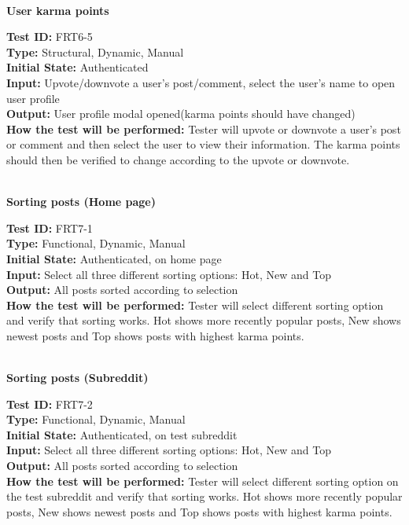 \documentclass[12pt,fleqn]{article}
\begin{document}
\textbf{\\User karma points}
\begin{tcolorbox}
\textbf{Test ID:} FRT6-5\\
\textbf{Type:} Structural, Dynamic, Manual\\
\textbf{Initial State:} Authenticated\\
\textbf{Input:} Upvote/downvote a user's post/comment, select the user's name to open user profile  \\
\textbf{Output:} User profile modal opened(karma points should have changed)\\
\textbf{How the test will be performed:} Tester will upvote or downvote a user's post or comment and then select the user to view their information. The karma points should then be verified to change according to the upvote or downvote.
\end{tcolorbox}

\textbf{\\Sorting posts (Home page)}
\begin{tcolorbox}
\textbf{Test ID:} FRT7-1\\
\textbf{Type:} Functional, Dynamic, Manual\\
\textbf{Initial State:} Authenticated, on home page\\
\textbf{Input:} Select all three different sorting options: Hot, New and Top \\
\textbf{Output:} All posts sorted according to selection\\
\textbf{How the test will be performed:} Tester will select different sorting option and verify that sorting works. Hot shows more recently popular posts, New shows newest posts and Top shows posts with highest karma points.
\end{tcolorbox}

\textbf{\\Sorting posts (Subreddit)}
\begin{tcolorbox}
\textbf{Test ID:} FRT7-2\\
\textbf{Type:} Functional, Dynamic, Manual\\
\textbf{Initial State:} Authenticated, on test subreddit\\
\textbf{Input:} Select all three different sorting options: Hot, New and Top \\
\textbf{Output:} All posts sorted according to selection\\
\textbf{How the test will be performed:} Tester will select different sorting option on the test subreddit and verify that sorting works. Hot shows more recently popular posts, New shows newest posts and Top shows posts with highest karma points.
\end{tcolorbox}
\end{document}
